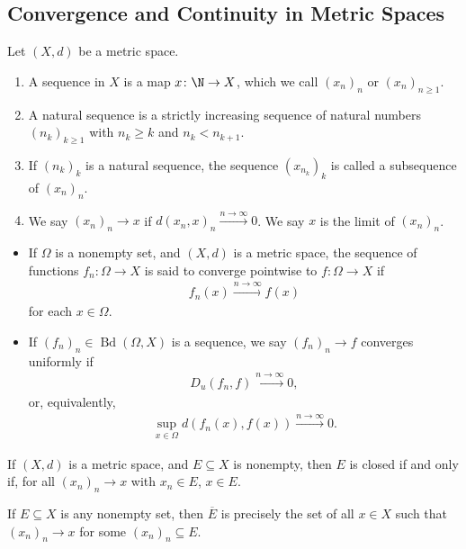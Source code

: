 \subsection{Convergence and Continuity in Metric Spaces}%
\begin{definition}
  Let $\left(X,d\right)$ be a metric space.
  \begin{enumerate}[(1)]
    \item A sequence in $X$ is a map $x\colon \N\rightarrow X$, which we call $\left(x_{n}\right)_{n}$ or $\left(x_{n}\right)_{n\geq 1}$.
    \item A natural sequence is a strictly increasing sequence of natural numbers $\left(n_{k}\right)_{k\geq 1}$ with $n_{k}\geq k$ and $n_{k} < n_{k+1}$.
    \item If $\left(n_k\right)_{k}$ is a natural sequence, the sequence $\left(x_{n_k}\right)_{k}$ is called a subsequence of $\left(x_{n}\right)_n$.
    \item We say $\left(x_n\right)_n\rightarrow x$ if $d\left(x_n,x\right)_{n} \xrightarrow{n\rightarrow\infty} 0$. We say $x$ is the limit of $\left(x_n\right)_n$.
  \end{enumerate}
\end{definition}
\begin{example}
  \begin{itemize}
    \item If $\Omega$ is a nonempty set, and $\left(X,d\right)$ is a metric space, the sequence of functions $f_n\colon \Omega\rightarrow X$ is said to converge pointwise to $f\colon \Omega\rightarrow X$ if
      \begin{align*}
        f_n\left(x\right)\xrightarrow{n\rightarrow\infty}f(x)
      \end{align*}
      for each $x\in \Omega$.
    \item If $\left(f_n\right)_n\in \operatorname{Bd}\left(\Omega,X\right)$ is a sequence, we say $\left(f_n\right)_n\rightarrow f$ converges uniformly if
      \begin{align*}
        D_u\left(f_n,f\right)\xrightarrow{n\rightarrow\infty}0,
      \end{align*}
      or, equivalently,
      \begin{align*}
        \sup_{x\in\Omega}d\left(f_n(x),f(x)\right)\xrightarrow{n\rightarrow\infty}0.
      \end{align*}
  \end{itemize}
\end{example}
\begin{definition}
  If $\left(X,d\right)$ is a metric space, and $E\subseteq X$ is nonempty, then $E$ is closed if and only if, for all $\left(x_n\right)_n\rightarrow x$ with $x_n\in E$, $x\in E$.\newline

  If $E\subseteq X$ is any nonempty set, then $\overline{E}$ is precisely the set of all $x\in X$ such that $\left(x_n\right)_n\rightarrow x$ for some $\left(x_n\right)_n\subseteq E$.
\end{definition}
